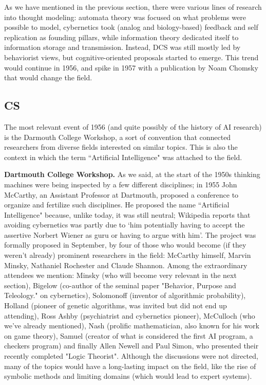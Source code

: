 \documentclass[../main.tex]{subfiles}
\begin{document}
As we have mentioned in the previous section, there were various lines of research into thought modeling: automata theory was focused on what problems were possible to model, cybernetics took (analog and biology-based) feedback and self replication as founding pillars, while information theory dedicated itself to information storage and transmission. Instead, DCS was still mostly led by behaviorist views, but cognitive-oriented proposals started to emerge. This trend would continue in 1956, and spike in 1957 with a publication by Noam Chomsky that would change the field.

\subsection{CS}
The most relevant event of 1956 (and quite possibly of the history of AI research) is the Darmouth College Workshop, a sort of convention that connected researchers from diverse fields interested on similar topics. This is also the context in which the term ``Artificial Intelligence" was attached to the field.

\vspace{4pt}
\textbf{Dartmouth College Workshop.}
As we said, at the start of the 1950s thinking machines were being inspected by a few different disciplines; in 1955 John McCarthy, an Assistant Professor at Dartmouth, proposed a conference to organize and fertilize such disciplines. He proposed the name ``Artificial Intelligence" because, unlike today, it was still neutral; Wikipedia reports that avoiding cybernetics was partly due to \enquote*{him potentially having to accept the assertive Norbert Wiener as guru or having to argue with him}. The project was formally proposed in September, by four of those who would become (if they weren't already) prominent researchers in the field: McCarthy himself, Marvin Minsky, Nathaniel Rochester and Claude Shannon. Among the extraordinary attendees we mention: Minsky (who will become very relevant in the next section), Bigelow (co-author of the seminal paper "Behavior, Purpose and Teleology." on cybernetics), Solomonoff (inventor of algorithmic probability), Holland (pioneer of genetic algorithms, was invited but did not end up attending), Ross Ashby (psychiatrist and cybernetics pioneer), McCulloch (who we've already mentioned), Nash (prolific mathematician, also known for his work on game theory), Samuel (creator of what is considered the first AI program, a checkers program) and finally Allen Newell and Paul Simon, who presented their recently completed "Logic Theorist". Although the discussions were not directed, many of the topics would have a long-lasting impact on the field, like the rise of symbolic methods and limiting domains (which would lead to expert systems).
\end{document}
